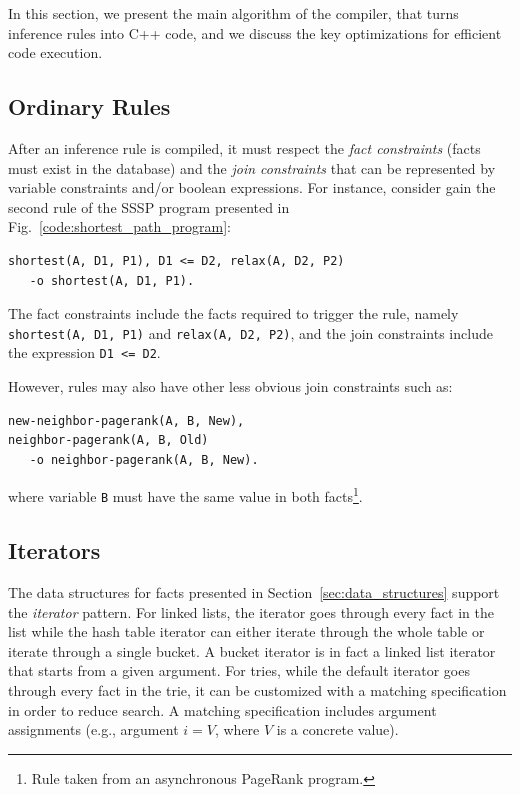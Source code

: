 
In this section, we present the main algorithm of the compiler, that turns
inference rules into C++ code, and we discuss the key optimizations for
efficient code execution.

\subsection{Ordinary Rules}\label{sec:compile}

After an inference rule is compiled, it must respect the \emph{fact constraints}
(facts must exist in the database) and the \emph{join constraints} that can be
represented by variable constraints and/or boolean expressions. For instance,
consider gain the second rule of the SSSP program presented in
Fig.~\ref{code:shortest_path_program}:

\begin{Verbatim}[fontsize=\scriptsize,label=example_rule]
shortest(A, D1, P1), D1 <= D2, relax(A, D2, P2)
   -o shortest(A, D1, P1).
\end{Verbatim}

The fact constraints include the facts required to trigger the rule, namely
\texttt{shortest(A, D1, P1)} and \texttt{relax(A, D2, P2)}, and the join
constraints include the expression \texttt{D1 <= D2}.

However, rules may also have other less obvious join constraints such as:

\begin{Verbatim}[fontsize=\scriptsize]
new-neighbor-pagerank(A, B, New),
neighbor-pagerank(A, B, Old)
   -o neighbor-pagerank(A, B, New).
\end{Verbatim}

where variable \texttt{B} must have the same value in both facts\footnote{Rule taken
from an asynchronous PageRank program.}.

\subsection{Iterators}

The data structures for facts presented in Section~\ref{sec:data_structures}
support the \emph{iterator} pattern. For linked lists, the iterator goes
through every fact in the list while the hash table iterator can either iterate
through the whole table or iterate through a single bucket. A bucket iterator is
in fact a linked list iterator that starts from a given argument.
For tries, while the default iterator goes through every fact in
the trie, it can be customized with a matching specification in
order to reduce search. A matching specification includes argument
assignments (e.g., argument $i = V$, where $V$ is a concrete value).

